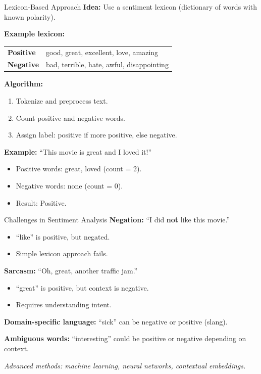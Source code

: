 \documentclass[10pt]{beamer}
\begin{document}
\begin{frame}{Lexicon-Based Approach}
    \textbf{Idea:} Use a sentiment lexicon (dictionary of words with known polarity).

    \vspace{0.2cm}
    \textbf{Example lexicon:}
    \small
    \begin{tabularx}{0.9\textwidth}{l l}
        \textbf{Positive} & good, great, excellent, love, amazing \\
        \textbf{Negative} & bad, terrible, hate, awful, disappointing
    \end{tabularx}

    \normalsize
    \vspace{0.2cm}
    \textbf{Algorithm:}
    \begin{enumerate}
        \item Tokenize and preprocess text.
        \item Count positive and negative words.
        \item Assign label: positive if more positive, else negative.
    \end{enumerate}

    \vspace{0.2cm}
    \textbf{Example:} ``This movie is great and I loved it!''
    \begin{itemize}
        \item Positive words: great, loved (count = 2).
        \item Negative words: none (count = 0).
        \item Result: Positive.
    \end{itemize}
\end{frame}

\begin{frame}{Challenges in Sentiment Analysis}
    \textbf{Negation:} ``I did \textbf{not} like this movie.''
    \begin{itemize}
        \item ``like'' is positive, but negated.
        \item Simple lexicon approach fails.
    \end{itemize}

    \vspace{0.2cm}
    \textbf{Sarcasm:} ``Oh, great, another traffic jam.''
    \begin{itemize}
        \item ``great'' is positive, but context is negative.
        \item Requires understanding intent.
    \end{itemize}

    \vspace{0.2cm}
    \textbf{Domain-specific language:} ``sick'' can be negative or positive (slang).

    \vspace{0.2cm}
    \textbf{Ambiguous words:} ``interesting'' could be positive or negative depending on context.

    \vspace{0.2cm}
    \textit{Advanced methods: machine learning, neural networks, contextual embeddings.}
\end{frame}
\end{document}
